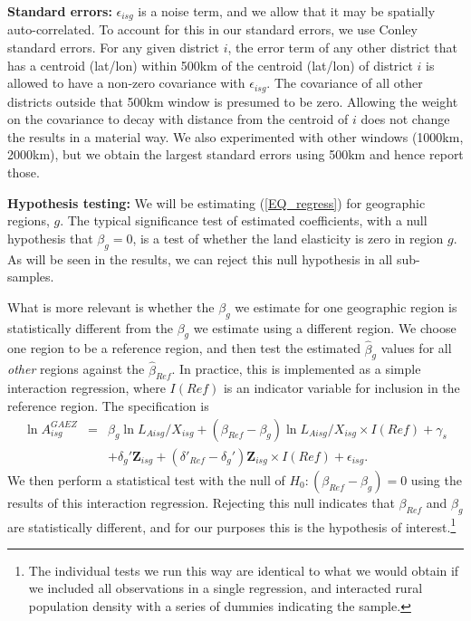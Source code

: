 \documentclass[11pt]{article}
\begin{document}
\vspace{.5cm}\noindent\textbf{Standard errors:} $\epsilon_{isg}$ is a noise term, and we allow that it may be spatially auto-correlated. To account for this in our standard errors, we use Conley standard errors. For any given district $i$, the error term of any other district that has a centroid (lat/lon) within 500km of the centroid (lat/lon) of district $i$ is allowed to have a non-zero covariance with $\epsilon_{isg}$. The covariance of all other districts outside that 500km window is presumed to be zero. Allowing the weight on the covariance to decay with distance from the centroid of $i$ does not change the results in a material way. We also experimented with other windows (1000km, 2000km), but we obtain the largest standard errors using 500km and hence report those.

\vspace{.5cm}\noindent\textbf{Hypothesis testing:} We will be estimating (\ref{EQ_regress}) for geographic regions, $g$. The typical significance test of estimated coefficients, with a null hypothesis that $\beta_g=0$, is a test of whether the land elasticity is zero in region $g$. As will be seen in the results, we can reject this null hypothesis in all sub-samples.

What is more relevant is whether the $\beta_g$ we estimate for one geographic region is statistically different from the $\beta_g$ we estimate using a different region. We choose one region to be a reference region, and then test the estimated $\hat{\beta}_g$ values for all \textit{other} regions against the $\hat{\beta}_{Ref}$. In practice, this is implemented as a simple interaction regression, where $I(Ref)$ is an indicator variable for inclusion in the reference region. The specification is
\begin{eqnarray}
    \ln A^{GAEZ}_{isg} &=& \beta_g \ln L_{Aisg}/X_{isg} + (\beta_{Ref} - \beta_g) \ln L_{Aisg}/X_{isg} \times I(Ref) + \gamma_{s} \\ \nonumber
     && + \delta_g' \mathbf{Z}_{isg} + (\delta'_{Ref} - \delta_g') \mathbf{Z}_{isg} \times I(Ref) + \epsilon_{isg}. \label{EQ_interaction}
\end{eqnarray}
We then perform a statistical test with the null of $H_0: (\beta_{Ref} - \beta_g) = 0$ using the results of this interaction regression. Rejecting this null indicates that $\beta_{Ref}$ and $\beta_g$ are statistically different, and for our purposes this is the hypothesis of interest.\footnote{The individual tests we run this way are identical to what we would obtain if we included all observations in a single regression, and interacted rural population density with a series of dummies indicating the sample.}
\end{document}
